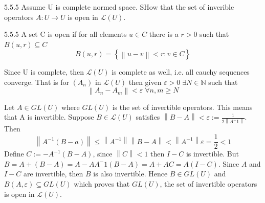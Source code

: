 \documentclass[a4paper,norsk]{article}
\renewcommand{\geq}{\geqslant}
\renewcommand{\leq}{\leqslant}
\renewcommand{\epsilon}{\varepsilon}
\begin{document}
\begin{oppgavebox}{5.5.5}{}
Assume U is complete normed space. SHow that the set of inverible operators $ A : U \to U $ is open in $ \mathcal{L}(U) $.

\begin{proofbox}{5.5.5}{}
    A set C is open if for all elements $ u \in C $ there is a $ r > 0 $ such that $ B(u, r) \subseteq C $
    \[
        B(u, r) = \left\{ \left\lVert u - v \right\rVert < r : v \in C  \right\} 
    \]
     

    Since U is complete, then $ \mathcal{L}(U) $ is complete as well, i.e. all cauchy sequences converge. That is for $ \left( A_n \right)  $ in $ \mathcal{L}(U) $  then given $ \epsilon > 0 \; \exists N \in \mathbb{N} $ such that
    \[
        \left\lVert A_n - A_m \right\rVert < \epsilon \; \forall n, m \geq N
    \]

    Let $ A \in GL(U) $ where $ GL(U) $ is the set of invertible operators. This means that A is invertible. Suppose $ B \in \mathcal{L}(U) $ satisfies $ \left\lVert B - A \right\rVert < \epsilon := \frac{ 1 }{ 2 \left\lVert A^-1 \right\rVert  } $. Then 
    \[
        \left\lVert A ^{-1} \left( B - a \right)   \right\rVert \leq \left\lVert A ^{-1}  \right\rVert  \left\lVert B - A \right\rVert < \left\lVert A ^{-1}  \right\rVert \epsilon = \frac{ 1 }{ 2 } < 1
    \]
    Define $ C := -A ^{-1} \left( B - A \right)   $, since $ \left\lVert C \right\rVert < 1 $ then $ I - C $ is invertible. But $ B = A + \left( B - A \right) = A - A A^-1 \left( B-A \right) = A + A C = A \left( I - C \right)$. Since $ A $  and $ I - C $ are invertible, then $ B $ is also invertible. Hence $ B \in GL(U) $ and $ B \left( A, \epsilon  \right) \subseteq GL(U)  $ which proves that $ GL(U) $, the set of invertible operators is open in $ \mathcal{L}(U) $.
\end{proofbox}
\end{oppgavebox}
\end{document}
